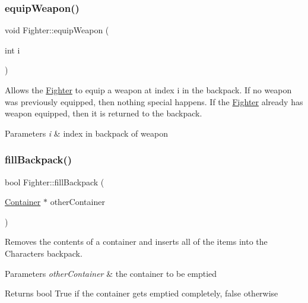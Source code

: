 \subsubsection{\texorpdfstring{equip\+Weapon()}{equipWeapon()}}
{\footnotesize\ttfamily void Fighter\+::equip\+Weapon (\begin{DoxyParamCaption}\item[{int}]{i }\end{DoxyParamCaption})}

Allows the \hyperlink{class_fighter}{Fighter} to equip a weapon at index \textquotesingle{}i\textquotesingle{} in the backpack. If no weapon was previously equipped, then nothing special happens. If the \hyperlink{class_fighter}{Fighter} already has weapon equipped, then it is returned to the backpack. 
\begin{DoxyParams}{Parameters}
{\em i} & index in backpack of weapon \\
\hline
\end{DoxyParams}
\hypertarget{class_fighter_a572fb61d329f4993701900ff3a1db5f8}{}\label{class_fighter_a572fb61d329f4993701900ff3a1db5f8} 
\subsubsection{\texorpdfstring{fill\+Backpack()}{fillBackpack()}}
{\footnotesize\ttfamily bool Fighter\+::fill\+Backpack (\begin{DoxyParamCaption}\item[{\hyperlink{class_container}{Container} $\ast$}]{other\+Container }\end{DoxyParamCaption})}

Removes the contents of a container and inserts all of the items into the Character\textquotesingle{}s backpack. 
\begin{DoxyParams}{Parameters}
{\em other\+Container} & the container to be emptied \\
\hline
\end{DoxyParams}
\begin{DoxyReturn}{Returns}
bool True if the container gets emptied completely, false otherwise 
\end{DoxyReturn}
\hypertarget{class_fighter_a774a40f8466eec10bee12b02e43e0aad}{}\label{class_fighter_a774a40f8466eec10bee12b02e43e0aad} 
